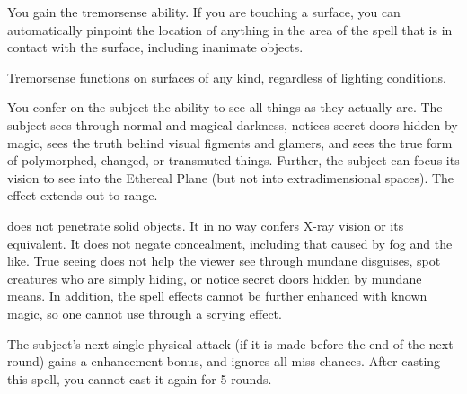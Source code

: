 \begin{spelleffect}
    You gain the tremorsense ability. If you are touching a surface, you can automatically pinpoint the location of anything in the area of the spell that is in contact with the surface, including inanimate objects.
\end{spelleffect}
\begin{spellnotes}
    Tremorsense functions on surfaces of any kind, regardless of lighting conditions.
\end{spellnotes}

\spelldur{\durshort}
\begin{spelleffect}
    You confer on the subject the ability to see all things as they actually are. The subject sees through normal and magical darkness, notices secret doors hidden by magic, sees the truth behind visual figments and glamers, and sees the true form of polymorphed, changed, or transmuted things. Further, the subject can focus its vision to see into the Ethereal Plane (but not into extradimensional spaces). The effect extends out to \rngmed range.
\end{spelleffect}
\begin{spellnotes}
     does not penetrate solid objects. It in no way confers X-ray vision or its equivalent. It does not negate concealment, including that caused by fog and the like. True seeing does not help the viewer see through mundane disguises, spot creatures who are simply hiding, or notice secret doors hidden by mundane means. In addition, the spell effects cannot be further enhanced with known magic, so one cannot use  through a scrying effect.
\end{spellnotes}

\begin{spelleffect}
    The subject's next single physical attack (if it is made before the end of the next round) gains a  enhancement bonus, and ignores all miss chances. After casting this spell, you cannot cast it again for 5 rounds.
\end{spelleffect}

